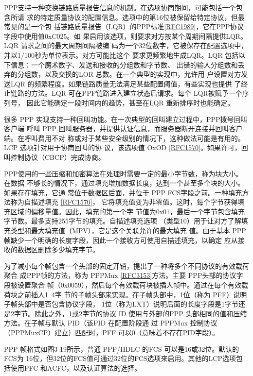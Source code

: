 PPP支持一种交换链路质量报告信息的机制。在选项协商期间，可能包括一个包含所请
求的特定质量协议的配置信息。选项中的第16位被保留给特定协议，但最常见的是一个包
括链路质量报告（LQR）的PPP标准\href{https://www.rfc-editor.org/rfc/rfc1989}{[RFC1989]}，它在PPP协议字段中使用值0xC025。如
果启用该选项，则要求对方按某个周期间隔提供LQR。LQR 请求之间的最大周期间隔被编
码为一个32位数字，它被保存在配置选项中，并以1/100秒为单位表示。对方可能比这个
要求更频繁地生成LQR。LQR 包括以下信息：一个魔术数字、发送和接收的分组数和字节数、
出错的输人分组数和丢弃的分组数，以及交换的LOR 总数。在一个典型的实现中，允许用
户设置对方发送LQR 的频繁程度。如果链路质量无法满足某些配置阈值，有些实现也提供
了终止链路的方法。LQR 可在PPP链路进入建立状态后请求。每个 LQR被赋予一个序列号，
因此它能确定一段时间内的趋势，甚至在LQR 重新排序时也能确定。

很多 PPP 实现支持一种回叫功能。在一次典型的回叫建立过程中，PPP拨号回叫客户端
呼叫 PPP 回叫服务器，并提供认证信息，而服务器断开连接并回叫客户端。在呼叫费用不对
称或对于某些安全级别的情况下，这种做法可能是有用的。LCP 选项针对用于协商回叫的协
议，该选项值 OxOD
\href{https://www.rfc-editor.org/rfc/rfc1570}{[RFC1570]}。如果许可，回叫控制协议（CBCP）完成协商。

PPP使用的一些压缩和加密算法在处理时需要一定的最小字节数，称为块大小。在数据
不够长的情况下，通过填充增加数据长度，达到一个甚至多个块的大小。如果存在填充，它通
常位于数据区后面，并位于 PPP FCS字段之前。一种填充方法称为自描述填充
\href{https://www.rfc-editor.org/rfc/rfc1570}{[RFC1570]}，
它将填充值变为非零值。这时，每个字节获得填充区域的偏移量值。因此，填充的第一个字
节值为0x01，最后一个字节包含填充字节数。最多支持255字节的填充。自描述填充选项
（类型10）用于让对方了解填充类型和最大填充值（MPV），它是这个关联允许的最大填充
值。由于基本 PPP 帧缺少一个明确的长度字段，因此一个接收方可使用自描述填充，以确定
应从接收的数据区删除多少填充字节。

为了减小每个帧包含一个头部的固定开销，提出了一种将多个不同协议的有效载荷聚合
成PPP帧的方法，称为 PPPMux
\href{https://www.rfc-editor.org/rfc/rfc3153}{[RFC3153]}方法。主要 PPP头部的协议字段被设置聚合
帧（0x0059），然后每个有效载荷块被插人帧中。通过在每个有效载荷块之前插人1~4字
节的子帧头部来实现。在子帧头部中，1位（称为 PFF）说明子帧头部中是否包含协议字段，
1位（称为LXT）说明后面的长度字段是1字节还是2字节。除此之外，1或2字节的协议
ID 使用与外部的PPP 头部相同的值和压缩方法。在子帧与默认 PID（该PID 在配置阶段通
过 PPPMux 控制协议（PPPMuxCP）建立）匹配时，PFF 可以0（意味着不存在PID字段）。

PPP 帧格式如图3-19所示，普通 PPP/HDLC 的FCS 可以是16或32位。默认的FCS为
16位，但32位的FCS值可通过32位的FCS选项来启用。其他的LCP选项包括使用PFC
和ACFC，以及认证算法的选择。


